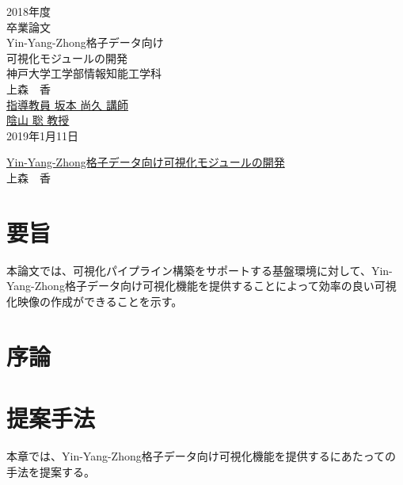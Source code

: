 \documentclass[12pt]{jarticle}
\begin{document}
\author{上森　香}
\date{today} 
\thispagestyle{empty}
\begin{center}
\huge{2018年度}\\
\huge{卒業論文}\\
\vspace{4cm}
\LARGE{Yin-Yang-Zhong格子データ向け\\可視化モジュールの開発}\\
\vspace{4cm}
\LARGE{神戸大学工学部情報知能工学科}\\
\vspace{0.45cm}
\LARGE{上森　香}\\
\vspace{1.2cm}
\LARGE{\underline{指導教員 坂本 尚久 講師}}\\
\hspace{31mm}\LARGE{\underline{陰山 \hspace{4mm} 聡 教授}}\\
\vspace{2cm}
\Large{2019年1月11日}
\end{center}

\newpage
\thispagestyle{empty}
\begin{center}
\Large{\underline{Yin-Yang-Zhong格子データ向け可視化モジュールの開発}}\\
\vspace{1.5cm}
\large{上森　香}
\end{center}
\vspace{1cm}
\section{要旨}
本論文では、可視化パイプライン構築をサポートする基盤環境に対して、Yin-Yang-Zhong格子データ向け可視化機能を提供することによって効率の良い可視化映像の作成ができることを示す。
 
 \newpage
\thispagestyle{empty}
\tableofcontents

\newpage
\setcounter{page}{1}
\section{序論}

\newpage
\section{提案手法}
本章では、Yin-Yang-Zhong格子データ向け可視化機能を提供するにあたっての手法を提案する。
\newpage
\end{document}
